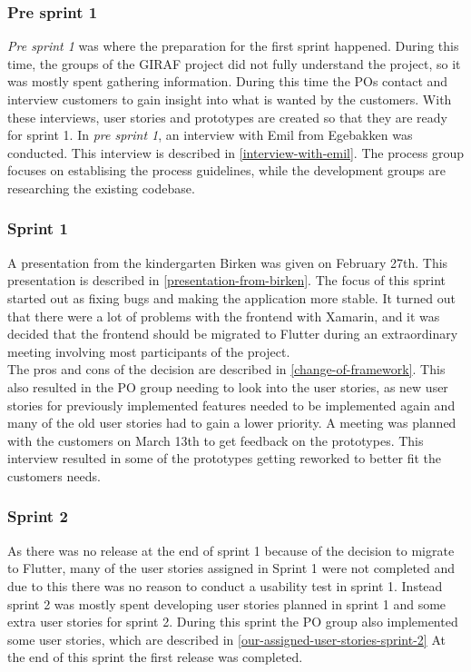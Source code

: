 \subsubsection{Pre sprint 1}
\textit{Pre sprint 1} was where the preparation for the first sprint happened.
During this time, the groups of the GIRAF project did not fully understand the project, so it was mostly spent gathering information.
During this time the POs contact and interview customers to gain insight into what is wanted by the customers.
With these interviews, user stories and prototypes are created so that they are ready for sprint 1.
In \textit{pre sprint 1}, an interview with Emil from Egebakken was conducted. 
This interview is described in \autoref{interview-with-emil}.
The process group focuses on establising the process guidelines, while the development groups are researching the existing codebase.

\subsubsection{Sprint 1}
A presentation from the kindergarten Birken was given on February 27th.
This presentation is described in \autoref{presentation-from-birken}.
The focus of this sprint started out as fixing bugs and making the application more stable.
It turned out that there were a lot of problems with the frontend with Xamarin, and it was decided that the frontend should be migrated to Flutter during an extraordinary meeting involving most participants of the project. \\
The pros and cons of the decision are described in \autoref{change-of-framework}.
This also resulted in the PO group needing to look into the user stories, as new user stories for previously implemented features needed to be implemented again and many of the old user stories had to gain a lower priority.
A meeting was planned with the customers on March 13th to get feedback on the prototypes. 
This interview resulted in some of the prototypes getting reworked to better fit the customers needs.

\subsubsection{Sprint 2}
As there was no release at the end of sprint 1 because of the decision to migrate to Flutter, many of the user stories assigned in Sprint 1 were not completed and due to this there was no reason to conduct a usability test in sprint 1.
Instead sprint 2 was mostly spent developing user stories planned in sprint 1 and some extra user stories for sprint 2.
During this sprint the PO group also implemented some user stories, which are described in \autoref{our-assigned-user-stories-sprint-2}
At the end of this sprint the first release was completed.

